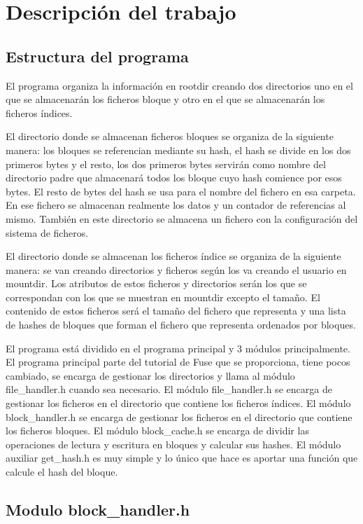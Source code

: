\documentclass[a4paper,12pt]{article}
\begin{document}
\section{Descripción del trabajo}

\subsection{Estructura del programa}
El programa organiza la información en rootdir creando dos directorios uno en el que se almacenarán los ficheros bloque y otro en el que se almacenarán los ficheros índices.
\bigskip

El directorio donde se almacenan ficheros bloques se organiza de la siguiente manera: los bloques se referencian mediante su hash, el hash se divide en los dos primeros bytes y el resto, los dos primeros bytes servirán como nombre del directorio padre que almacenará todos los bloque cuyo hash comience por esos bytes. El resto de bytes del hash se usa para el nombre del fichero en esa carpeta. En ese fichero se almacenan realmente los datos y un contador de referencias al mismo. También en este directorio se almacena un fichero con la configuración del sistema de ficheros.
\bigskip

El directorio donde se almacenan los ficheros índice se organiza de la siguiente manera: se van creando directorios y ficheros según los va creando el usuario en mountdir. Los atributos de estos ficheros y directorios serán los que se correspondan con los que se muestran en mountdir excepto el tamaño. El contenido de estos ficheros será el tamaño del fichero que representa y una lista de hashes de bloques que forman el fichero que representa ordenados por bloques.
\bigskip

El programa está dividido en el programa principal y 3 módulos principalmente. El programa principal parte del tutorial de Fuse que se proporciona, tiene pocos cambiado, se encarga de gestionar los directorios y llama al módulo file\_handler.h cuando sea necesario. El módulo file\_handler.h se encarga de gestionar los ficheros en el directorio que contiene los ficheros índices. El módulo block\_handler.h se encarga de gestionar los ficheros en el directorio que contiene los ficheros bloques. El módulo block\_cache.h se encarga de dividir las operaciones de lectura y escritura en bloques y calcular sus hashes. El módulo auxiliar get\_hash.h es muy simple y lo único que hace es aportar una función que calcule el hash del bloque.

\subsection{Modulo block\_handler.h}
\end{document}
